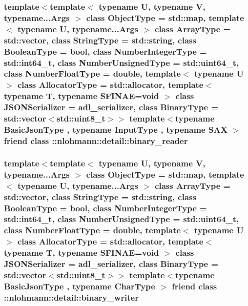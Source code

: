 \subsubsection[{\texorpdfstring{\+::nlohmann\+::detail\+::binary\+\_\+reader}{::nlohmann::detail::binary_reader}}]{\setlength{\rightskip}{0pt plus 5cm}template$<$template$<$ typename U, typename V, typename...\+Args $>$ class Object\+Type = std\+::map, template$<$ typename U, typename...\+Args $>$ class Array\+Type = std\+::vector, class String\+Type  = std\+::string, class Boolean\+Type  = bool, class Number\+Integer\+Type  = std\+::int64\+\_\+t, class Number\+Unsigned\+Type  = std\+::uint64\+\_\+t, class Number\+Float\+Type  = double, template$<$ typename U $>$ class Allocator\+Type = std\+::allocator, template$<$ typename T, typename S\+F\+I\+N\+A\+E=void $>$ class J\+S\+O\+N\+Serializer = adl\+\_\+serializer, class Binary\+Type  = std\+::vector$<$std\+::uint8\+\_\+t$>$$>$ template$<$typename Basic\+Json\+Type , typename Input\+Type , typename S\+AX $>$ friend class \+::{\bf nlohmann\+::detail\+::binary\+\_\+reader}\hspace{0.3cm}{\ttfamily [friend]}}\hypertarget{classnlohmann_1_1basic__json_aa226ed5103dfd10e27e562d35a3a106b}{}\label{classnlohmann_1_1basic__json_aa226ed5103dfd10e27e562d35a3a106b}
\subsubsection[{\texorpdfstring{\+::nlohmann\+::detail\+::binary\+\_\+writer}{::nlohmann::detail::binary_writer}}]{\setlength{\rightskip}{0pt plus 5cm}template$<$template$<$ typename U, typename V, typename...\+Args $>$ class Object\+Type = std\+::map, template$<$ typename U, typename...\+Args $>$ class Array\+Type = std\+::vector, class String\+Type  = std\+::string, class Boolean\+Type  = bool, class Number\+Integer\+Type  = std\+::int64\+\_\+t, class Number\+Unsigned\+Type  = std\+::uint64\+\_\+t, class Number\+Float\+Type  = double, template$<$ typename U $>$ class Allocator\+Type = std\+::allocator, template$<$ typename T, typename S\+F\+I\+N\+A\+E=void $>$ class J\+S\+O\+N\+Serializer = adl\+\_\+serializer, class Binary\+Type  = std\+::vector$<$std\+::uint8\+\_\+t$>$$>$ template$<$typename Basic\+Json\+Type , typename Char\+Type $>$ friend class \+::{\bf nlohmann\+::detail\+::binary\+\_\+writer}\hspace{0.3cm}{\ttfamily [friend]}}\hypertarget{classnlohmann_1_1basic__json_a69d491bbda88ade6d3c7a2b11309e8bf}{}\label{classnlohmann_1_1basic__json_a69d491bbda88ade6d3c7a2b11309e8bf}
